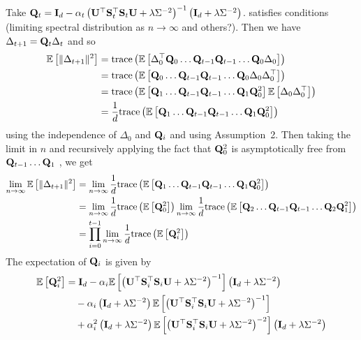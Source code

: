 Take $\mathbf{Q}_t=\mathbf{I}_d - \alpha_t\left(\mathbf{U}^\top\mathbf{S}_t^\top\mathbf{S}_t\mathbf{U} + \lambda\Sigma^{-2}\right)^{-1}\left(\mathbf{I}_d + \lambda\Sigma^{-2}\right)$. \todo satisfies conditions (limiting spectral distribution as $n\rightarrow\infty$ and others?). Then we have $\Delta_{t+1}=\mathbf{Q}_t\Delta_t$ and so
\begin{align*}
\mathbb{E}\left[\|\Delta_{t+1}\|^2\right] &= \mathrm{trace}\left(\mathbb{E}\left[\Delta_0^\top\mathbf{Q}_0\ldots \mathbf{Q}_{t-1}\mathbf{Q}_{t-1}\ldots\mathbf{Q}_0\Delta_0\right]\right) \\
&= \mathrm{trace}\left(\mathbb{E}\left[\mathbf{Q}_0\ldots \mathbf{Q}_{t-1}\mathbf{Q}_{t-1}\ldots\mathbf{Q}_0\Delta_0\Delta_0^\top\right]\right) \\
&= \mathrm{trace}\left(\mathbb{E}\left[\mathbf{Q}_1\ldots \mathbf{Q}_{t-1}\mathbf{Q}_{t-1}\ldots\mathbf{Q}_1\mathbf{Q}_0^2\right]\mathbb{E}\left[\Delta_0\Delta_0^\top\right]\right) \\
&= \frac{1}{d}\mathrm{trace}\left(\mathbb{E}\left[\mathbf{Q}_1\ldots \mathbf{Q}_{t-1}\mathbf{Q}_{t-1}\ldots\mathbf{Q}_1\mathbf{Q}_0^2\right]\right)
\end{align*}
using the independence of $\Delta_0$ and $\mathbf{Q}_i$ and using Assumption~2. Then taking the limit in $n$ and recursively applying the fact that $\mathbf{Q}_0^2$ is asymptotically free from $\mathbf{Q}_{t-1}\ldots\mathbf{Q}_1$ \todo, we get
\begin{align*}
\lim_{n\rightarrow\infty}\mathbb{E}\left[\|\Delta_{t+1}\|^2\right] &= \lim_{n\rightarrow\infty}\frac{1}{d}\mathrm{trace}\left(\mathbb{E}\left[\mathbf{Q}_1\ldots \mathbf{Q}_{t-1}\mathbf{Q}_{t-1}\ldots\mathbf{Q}_1\mathbf{Q}_0^2\right]\right) \\
&= \lim_{n\rightarrow\infty}\frac{1}{d}\mathrm{trace}\left(\mathbb{E}\left[\mathbf{Q}_0^2\right]\right)\lim_{n\rightarrow\infty}\frac{1}{d}\mathrm{trace}\left(\mathbb{E}\left[\mathbf{Q}_2\ldots \mathbf{Q}_{t-1}\mathbf{Q}_{t-1}\ldots\mathbf{Q}_2\mathbf{Q}_1^2\right]\right) \\
&= \prod_{i=0}^{t-1}\lim_{n\rightarrow\infty}\frac{1}{d}\mathrm{trace}\left(\mathbb{E}\left[\mathbf{Q}_i^2\right]\right)
\end{align*}
\todo The expectation of $\mathbf{Q}_i$ is given by
\begin{align*}
\mathbb{E}\left[\mathbf{Q}_i^2\right] &= \mathbf{I}_d - \alpha_i\mathbb{E}\left[\left(\mathbf{U}^\top\mathbf{S}_i^\top\mathbf{S}_i\mathbf{U} + \lambda\Sigma^{-2}\right)^{-1}\right]\left(\mathbf{I}_d + \lambda\Sigma^{-2}\right) \\
&\quad - \alpha_i\left(\mathbf{I}_d + \lambda\Sigma^{-2}\right)\mathbb{E}\left[\left(\mathbf{U}^\top\mathbf{S}_i^\top\mathbf{S}_i\mathbf{U} + \lambda\Sigma^{-2}\right)^{-1}\right] \\
&\quad + \alpha_i^2\left(\mathbf{I}_d + \lambda\Sigma^{-2}\right)\mathbb{E}\left[\left(\mathbf{U}^\top\mathbf{S}_i^\top\mathbf{S}_i\mathbf{U} + \lambda\Sigma^{-2}\right)^{-2}\right]\left(\mathbf{I}_d + \lambda\Sigma^{-2}\right)
\end{align*}
